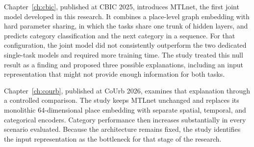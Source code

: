 Chapter~\ref{ch:cbic}, published at CBIC 2025, introduces MTLnet, the first joint model
developed in this research. It combines a place-level graph embedding with hard
parameter sharing, in which the tasks share one trunk of hidden layers, and predicts category classification and the next category
in a sequence. For that configuration, the joint model did not consistently outperform
the two dedicated single-task models and required more training time. The study
treated this null result as a finding and proposed three possible explanations,
including an input representation that might not provide enough information for both
tasks.

Chapter~\ref{ch:courb}, published at CoUrb 2026, examines that explanation through a
controlled comparison. The study keeps MTLnet unchanged and replaces its monolithic
64-dimensional place embedding with separate spatial, temporal, and categorical
encoders. Category performance then increases substantially in every scenario evaluated.
Because the architecture remains fixed, the study identifies the input representation
as the bottleneck for that stage of the research.

